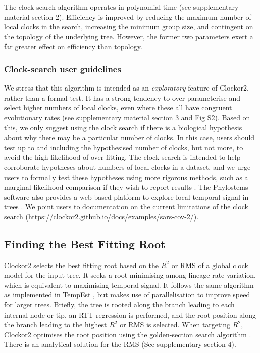 \documentclass{article}
\begin{document}
The clock-search algorithm operates in polynomial time (see supplementary material section 2). Efficiency is improved by reducing the maximum number of local clocks in the search, increasing the minimum group size, and contingent on the topology of the underlying tree. However, the former two parameters exert a far greater effect on efficiency than topology.

{
\subsubsection*{Clock-search user guidelines}
We stress that this algorithm is intended as an \emph{exploratory} feature of Clockor2, rather than a formal test. It has a strong tendency to over-parameterise and select higher numbers of local clocks, even where these all have congruent evolutionary rates (see supplementary material section 3 and Fig S2). Based on this, we only suggest using the clock search if there is a biological hypothesis about why there may be a particular number of clocks. In this case, users should test up to and including the hypothesised number of clocks, but not more, to avoid the high-likelihood of over-fitting. The clock search is intended to help corroborate hypotheses about numbers of local clocks in a dataset, and we urge users to formally test these hypotheses using more rigorous methods, such as a marginal likelihood comparison if they wish to report results \citep{tay_detecting_2023,drummond_bayesian_2010}. The Phylostems software also provides a web-based platform to explore local temporal signal in trees \citep{doizy_2023_phylostems}. We point users to documentation on the current limitations of the clock search (\url{https://clockor2.github.io/docs/examples/sars-cov-2/}).}

\subsection*{Finding the Best Fitting Root}
Clockor2 selects the best fitting root based on the $R^2$ or RMS of a global clock model for the input tree. {It seeks a root minimising among-lineage rate variation, which is equivalent to maximising temporal signal.} It follows the same algorithm as implemented in TempEst \citep{rambaut_exploring_2016}, but makes use of parallelisation to improve speed for larger trees. Briefly, the tree is rooted along the branch leading to each internal node or tip, an RTT regression is performed, and the root position along the branch leading to the highest $R^2$ or RMS is selected. When targeting $R^2$, Clockor2 optimises the root position using the golden-section search algorithm \citep{kiefer_sequential}. There is an analytical solution for the RMS (See supplementary section 4).
\end{document}
